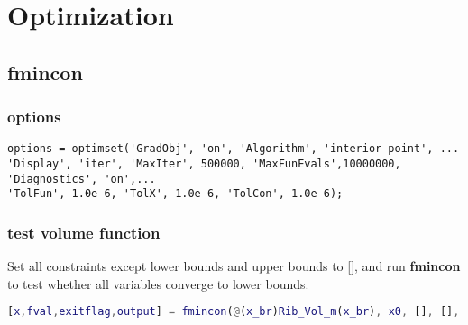 
\chapter{Optimization}

\section{fmincon}
\subsection{options}
\begin{lstlisting}
options = optimset('GradObj', 'on', 'Algorithm', 'interior-point', ...
'Display', 'iter', 'MaxIter', 500000, 'MaxFunEvals',10000000,  'Diagnostics', 'on',...
'TolFun', 1.0e-6, 'TolX', 1.0e-6, 'TolCon', 1.0e-6);
\end{lstlisting}

\subsection{test volume function}
Set all constraints except lower bounds and upper bounds to [], and run \textbf{fmincon} to test whether all variables converge to lower bounds.

\begin{lstlisting}[language=matlab]
[x,fval,exitflag,output] = fmincon(@(x_br)Rib_Vol_m(x_br), x0, [], [], [], [], lx, ux, [], options);
\end{lstlisting}